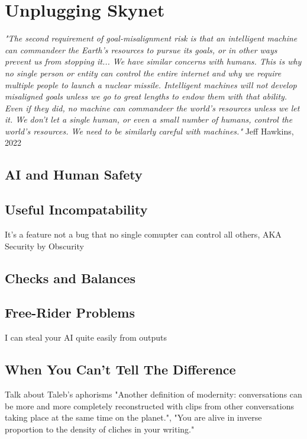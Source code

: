 \setchapterpreamble[u]{\margintoc}
\chapter{Unplugging Skynet}

\textit{"The second requirement of goal-misalignment risk is that an intelligent machine can commandeer the Earth's resources to pursue its goals, or in other ways prevent us from stopping it... We have similar concerns with humans. This is why no single person or entity can control the entire internet and why we require multiple people to launch a nuclear missile. Intelligent machines will not develop misaligned goals unless we go to great lengths to endow them with that ability. Even if they did, no machine can commandeer the world's resources unless we let it. We don't let a single human, or even a small number of humans, control the world's resources. We need to be similarly careful with machines."} Jeff Hawkins, 2022 \cite{hawkins_2022}

\section{AI and Human Safety}

\section{Useful Incompatability}

It's a feature not a bug that no single comupter can control all others, AKA Security by Obscurity

\section{Checks and Balances}

\section{Free-Rider Problems}

I can steal your AI quite easily from outputs

\section{When You Can't Tell The Difference}

Talk about Taleb's aphorisms "Another definition of modernity: conversations can be more and more completely reconstructed with clips from other conversations taking place at the same time on the planet.", "You are alive in inverse proportion to the density of cliches in your writing." 

